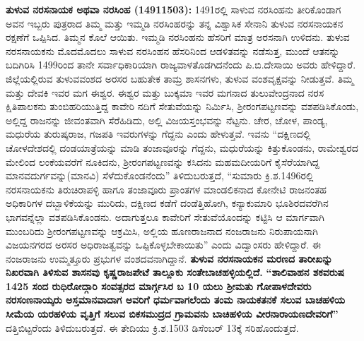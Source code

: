 \textbf{ ತುಳುವ ನರಸನಾಯಕ ಅಥವಾ ನರಸಿಂಹ (14911503): } 1491ರಲ್ಲಿ ಸಾಳುವ ನರಸಿಂಹನು ತೀರಿಕೊಂಡಾಗ ಅವನ ಇಬ್ಬರು ಪುತ್ರರಾದ ತಿಮ್ಮ ಮತ್ತು ಇಮ್ಮಡಿ ನರಸಿಂಹರನ್ನು ತನ್ನ ವಿಶ್ವಾಸಿಕ ಸೇನಾನಿ ತುಳುವ ನರಸನಾಯಕನ ರಕ್ಷಣೆಗೆ ಒಪ್ಪಿಸಿದ. ತಿಮ್ಮನ ಕೊಲೆ ಆಯಿತು. ಇಮ್ಮಡಿ ನರಸಿಂಹನು ಹೆಸರಿಗೆ ಮಾತ್ರ ಅರಸನಾಗಿ ಉಳಿದನು. ತುಳುವ ನರಸನಾಯಕನು ಮೊದಮೊದಲು ಸಾಳುವ ನರಸಿಂಹನ ಹೆಸರಿನಿಂದ ಆಡಳಿತವನ್ನು ನಡೆಸುತ್ತ, ಮುಂದೆ ಆತನನ್ನು ಬದಿಗಿರಿಸಿ 1499ರಿಂದ ತಾನೇ ಸರ್ವಾಧಿಕಾರಿಯಾಗಿ ರಾಜ್ಯವಾಳತೊಡಗಿದನೆಂದು ಪಿ.ಬಿ.ದೇಸಾಯಿ ಅವರು ಹೇಳಿದ್ದಾರೆ. ಜಿಲ್ಲೆಯಲ್ಲಿರುವ ತುಳುವವಂಶದ ಅರಸರ ಬಹುತೇಕ ತಾಮ್ರ ಶಾಸನಗಳು, ತುಳುವ ವಂಶವೃಕ್ಷವನ್ನು ನೀಡುತ್ತವೆ. ತಿಮ್ಮ ಮತ್ತು ದೇವಕಿ ಇವರ ಮಗ ಈಶ್ವರ. ಈಶ್ವರ ಮತ್ತು ಬುಕ್ಕಮಾ ಇವರ ಮಗನಾದ ತುಲುವೇಂದ್ರನಾದ ನರಸ ಕ್ಷಿತಿಪಾಲಕನು ತುಂಬಿಹರಿಯುತ್ತಿದ್ದ ಕಾವೇರಿ ನದಿಗೆ ಸೇತುವೆಯನ್ನು ನಿರ್ಮಿಸಿ, ಶ‍್ರೀರಂಗಪಟ್ಟಣವನ್ನು ವಶಪಡಿಸಿಕೊಂಡು, ಅಲ್ಲಿದ್ದ ರಾಜನನ್ನು ಜೀವಂತವಾಗಿ ಸೆರೆಹಿಡಿದು, ಅಲ್ಲಿ ವಿಜಯಸ್ತಂಭವನ್ನು ನೆಟ್ಟನು. ಚೇರ, ಚೋಳ, ಪಾಂಡ್ಯ, ಮಧುರೆಯ ತುರುಷ್ಕರಾಜ, ಗಜಪತಿ ಇವರುಗಳನ್ನು ಗೆದ್ದನು ಎಂದು ಹೇಳುತ್ತವೆ. ಇವನು “ದಕ್ಷಿಣದಲ್ಲಿ ಚೋಳದೇಶದಲ್ಲಿ ದಂಡಯಾತ್ರೆಯನ್ನು ಮಾಡಿ ತಂಜಾವೂರನ್ನು ಗೆದ್ದನು, ಮಧುರೆಯನ್ನು ಕಿತ್ತುಕೊಂಡನು, ರಾಮೇಶ್ವರದ ಮೇಲಿಂದ ಲಂಕೆಯವರೆಗೆ ನೂಕಿದನು, ಶ‍್ರೀರಂಗಪಟ್ಟಣವನ್ನು ಕಸಿದನು ಮಹಮದೀಯರಿಗೆ ಕೈಸೆರೆಯಾಗಿದ್ದ ಮಾನವದುರ್ಗವನ್ನು(ಮಾನವಿ) ಸೆಳೆದುಕೊಂಡನೆಂದು” ತಿಳಿದುಬರುತ್ತದೆ, “ಸುಮಾರು ಕ್ರಿ.ಶ.1496ರಲ್ಲಿ ನರಸನಾಯಕನು ತಿರುಚಿರಾಪಳ್ಳಿ ಹಾಗೂ ತಂಜಾವೂರು ಪ್ರಾಂತಗಳ ಮಾಂಡಲಿಕನಾದ ಕೋನೇಟಿ ರಾಜನಂತಹ ಅಧಿಕಾರಿಗಳ ದಬ್ಬಾಳಿಕೆಯನ್ನು ಮುರಿದು, ದಕ್ಷಿಣದ ಕಡೆಗೆ ದಂಡೆತ್ತಿಹೋಗಿ, ಕನ್ಯಾಕುಮಾರಿ ಭೂಶಿರದವರೆಗಿನ ಭಾಗವನ್ನೆಲ್ಲಾ ವಶಪಡಿಸಿಕೊಂಡನು. ಅದಾಗುತ್ತಲೂ ಕಾವೇರಿಗೆ ಸೇತುವೆಯೊಂದನ್ನು ಕಟ್ಟಿಸಿ ಆ ಮಾರ್ಗವಾಗಿ ಮುಂಬರಿದು ಶ‍್ರೀರಂಗಪಟ್ಟಣವನ್ನು ಆಕ್ರಮಿಸಿ, ಅಲ್ಲಿಯ ಹೂಣರಾಜನಾದ ನಂಜರಾಜನು ನಿರುಪಾಯನಾಗಿ ವಿಜಯನಗರದ ಅರಸರ ಅಧಿರಾಜತ್ವವನ್ನು ಒಪ್ಪಿಕೊಳ್ಳಬೇಕಾಯಿತು” ಎಂದು ವಿದ್ವಾಂಸರು ಹೇಳಿದ್ದಾರೆ.  ಈ ನಂಜರಾಜನು ಉಮ್ಮತ್ತೂರು ಪ್ರಭುಗಳ ವಂಶದವನಾಗಿದ್ದಾನೆ. \textbf{ತುಳುವ ನರಸನಾಯಕನ ಮರಣದ ತಾರೀಖನ್ನು ನಿಖರವಾಗಿ ತಿಳಿಸುವ ಶಾಸನವು ಕೃಷ್ಣರಾಜಪೇಟೆ ತಾಲ್ಲೂಕು ಸಂತೇಬಾಚಹಳ್ಳಿಯಲ್ಲಿದೆ.} \textbf{“ಶಾಲಿವಾಹನ ಶಕವರುಷ 1425 ಸಂದ ರುಧಿರೋದ್ಗಾರಿ ಸಂವತ್ಸರದ ಮಾರ್ಗ್ಗಸಿರ ಬ 10 ಯಲು ಶ‍್ರೀಮತು ಗೋಪಾಳದೇವರು ನರಸಂಣನಾಯ್ಕರು ಅಸ್ತಮಾನವಾದಾಗ ಅವರಿಗೆ ಧರ್ಮವಾಗಲೆಂದು ತಂಮ ನಾಯಕತನಕೆ ಸಲುವ ಬಾಚಹಳಿಯ ಸೀಮೆಯ ಯರಹಳಿಯ ವೃತ್ತಿಗೆ ಸಲುವ ಬಿಕಸಮುದ್ರದ ಗ್ರಾಮವನು ಬಾಚಿಹಳಿಯ ವೀರನಾರಾಯಣದೇವರಿಗೆ”} ದತ್ತಿಬಿಟ್ಟರೆಂದು ತಿಳಿದುಬರುತ್ತದೆ. ಈ ತೇದಿಯು ಕ್ರಿ.ಶ.1503 ಡಿಸೆಂಬರ್​ 13ಕ್ಕೆ ಸರಿಹೊಂದುತ್ತದೆ.

